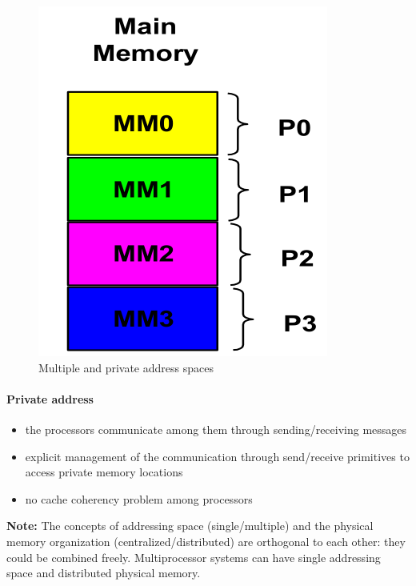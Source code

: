 \begin{figure}[h]
    \centering
    \includegraphics[scale = 0.3]{images/multiple-and-private-address-spaces}
    \caption{Multiple and private address spaces}
    \label{fig:multiple-and-private-address-spaces}
\end{figure}

\paragraph{Private address}
\begin{itemize}
    \item the processors communicate among them through sending/receiving messages
    \item explicit management of the communication through send/receive primitives to access private memory locations
    \item no cache coherency problem among processors
\end{itemize}

\textbf{Note:} The concepts of addressing space
(single/multiple) and the physical memory
organization (centralized/distributed) are
orthogonal to each other: they could be combined freely.
Multiprocessor systems can have single
addressing space and distributed physical
memory.

